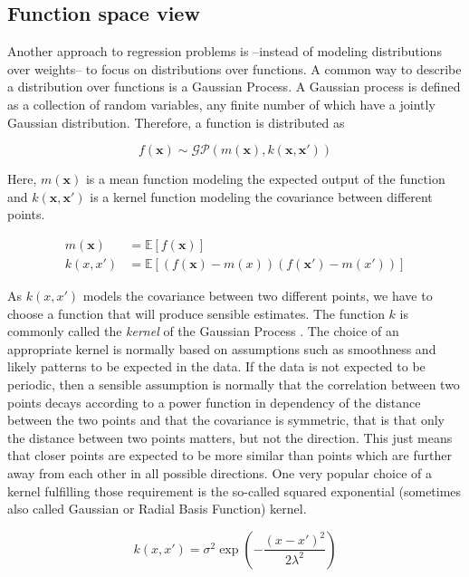 \documentclass[authoryear,11pt,review]{elsarticle}
\begin{document}
\subsection{Function space view}
Another approach to regression problems is --instead of modeling distributions over weights-- to focus on distributions over functions. A common way to describe a distribution over functions is a Gaussian Process. A Gaussian process is defined as a collection of random variables, any finite number of which have a jointly Gaussian distribution. Therefore, a function is distributed as

\begin{equation*}
f(\mathbf{x}) \sim \mathcal{GP}(m(\mathbf{x}),k(\mathbf{x},  \mathbf{x}'))
\end{equation*}

Here, $m(\mathbf{x})$ is a mean function modeling the expected output of the function and $k( \mathbf{x}, \mathbf{x}')$ is a kernel function modeling the covariance between different points. 

\begin{align*}
m( \mathbf{x})&=\mathbb{E}[f( \mathbf{x})]\\
k(x,x')&=\mathbb{E}\left[(f( \mathbf{x})-m(x))(f( \mathbf{x'})-m(x'))\right]
\end{align*}

As $k(x,x')$ models the covariance between two different points, we have to choose a function that will produce sensible estimates. The function $k$ is commonly called the \emph{kernel} of the Gaussian Process \citep{jakel2007tutorial}. The choice of an appropriate kernel is normally based on assumptions such as smoothness and likely patterns to be expected in the data. If the data is not expected to be periodic, then a sensible assumption is normally that the correlation between two points decays according to a power function in dependency of the distance between the two points and that the covariance is symmetric, that is that only the distance between two points matters, but not the direction. This just means that closer points are expected to be more similar than points which are further away from each other in all possible directions. One very popular choice of a kernel fulfilling those requirement is the so-called squared exponential (sometimes also called Gaussian or Radial Basis Function) kernel.

\begin{equation*}
k(x,x') =\sigma^2\exp\left(-\frac{(x-x')^2}{2\lambda^ 2}\right)
\end{equation*}
\end{document}
